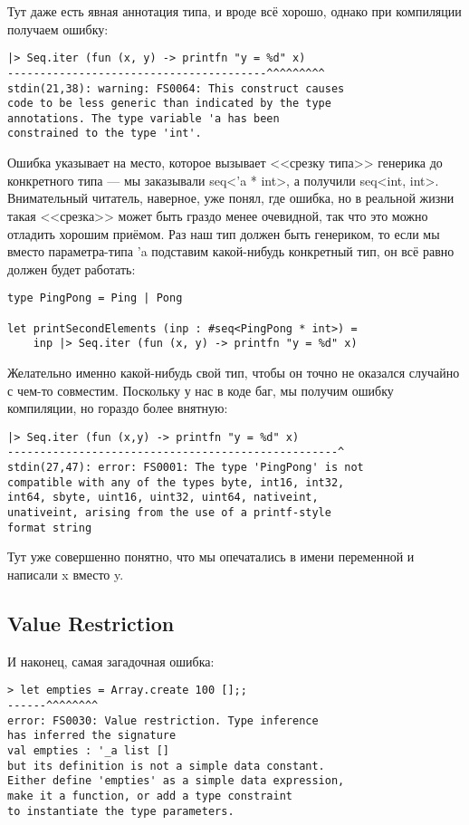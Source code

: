 \documentclass[a5paper]{article}
\begin{document}
Тут даже есть явная аннотация типа, и вроде всё хорошо, однако при компиляции получаем ошибку:

\begin{verbatim}
|> Seq.iter (fun (x, y) -> printfn "y = %d" x)
----------------------------------------^^^^^^^^^
stdin(21,38): warning: FS0064: This construct causes 
code to be less generic than indicated by the type 
annotations. The type variable 'a has been 
constrained to the type 'int'.
\end{verbatim}

Ошибка указывает на место, которое вызывает <<срезку типа>> генерика до конкретного типа --- мы заказывали seq<'a * int>, а получили seq<int, int>. Внимательный читатель, наверное, уже понял, где ошибка, но в реальной жизни такая <<срезка>> может быть граздо менее очевидной, так что это можно отладить хорошим приёмом. Раз наш тип должен быть генериком, то если мы вместо параметра-типа 'a подставим какой-нибудь конкретный тип, он всё равно должен будет работать:

\begin{verbatim}
type PingPong = Ping | Pong

let printSecondElements (inp : #seq<PingPong * int>) =
    inp |> Seq.iter (fun (x, y) -> printfn "y = %d" x)
\end{verbatim}

Желательно именно какой-нибудь свой тип, чтобы он точно не оказался случайно с чем-то совместим. Поскольку у нас в коде баг, мы получим ошибку компиляции, но гораздо более внятную:


\begin{verbatim}
|> Seq.iter (fun (x,y) -> printfn "y = %d" x)
---------------------------------------------------^
stdin(27,47): error: FS0001: The type 'PingPong' is not 
compatible with any of the types byte, int16, int32, 
int64, sbyte, uint16, uint32, uint64, nativeint, 
unativeint, arising from the use of a printf-style 
format string
\end{verbatim}

Тут уже совершенно понятно, что мы опечатались в имени переменной и написали x вместо y. 

\subsection{Value Restriction}

И наконец, самая загадочная ошибка:

\begin{verbatim}
> let empties = Array.create 100 [];;
------^^^^^^^^
error: FS0030: Value restriction. Type inference 
has inferred the signature 
val empties : '_a list []
but its definition is not a simple data constant. 
Either define 'empties' as a simple data expression, 
make it a function, or add a type constraint 
to instantiate the type parameters.
\end{verbatim}
\end{document}

